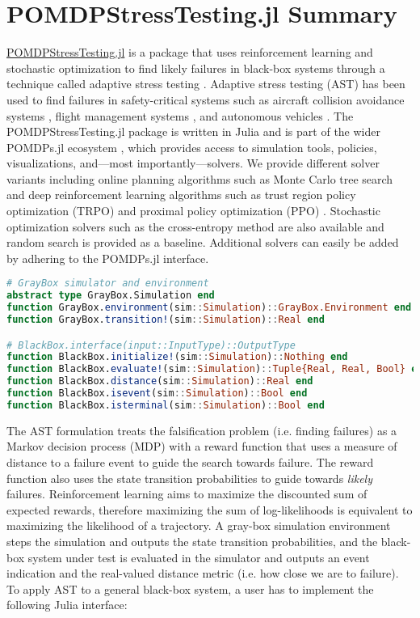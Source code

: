 \section{POMDPStressTesting.jl Summary}

\href{https://github.com/sisl/POMDPStressTesting.jl}{POMDPStressTesting.jl} is a package that uses reinforcement learning and stochastic optimization to find likely failures in black-box systems through a technique called adaptive stress testing \cite{ast}.
Adaptive stress testing (AST) has been used to find failures in safety-critical systems such as aircraft collision avoidance systems \cite{ast_acasx}, flight management systems \cite{ast_fms}, and autonomous vehicles \cite{ast_av}.
The POMDPStressTesting.jl package is written in Julia \cite{bezanson2017julia} and is part of the wider POMDPs.jl ecosystem \cite{pomdps_jl}, which provides access to simulation tools, policies, visualizations, and---most importantly---solvers.
We provide different solver variants including online planning algorithms such as Monte Carlo tree search \cite{mcts} and deep reinforcement learning algorithms such as trust region policy optimization (TRPO) \cite{trpo} and proximal policy optimization (PPO) \cite{ppo}.
Stochastic optimization solvers such as the cross-entropy method \cite{cem} are also available and random search is provided as a baseline.
Additional solvers can easily be added by adhering to the POMDPs.jl interface.

\begin{lstlisting}[language=Julia]
# GrayBox simulator and environment
abstract type GrayBox.Simulation end
function GrayBox.environment(sim::Simulation)::GrayBox.Environment end
function GrayBox.transition!(sim::Simulation)::Real end

# BlackBox.interface(input::InputType)::OutputType
function BlackBox.initialize!(sim::Simulation)::Nothing end
function BlackBox.evaluate!(sim::Simulation)::Tuple{Real, Real, Bool} end
function BlackBox.distance(sim::Simulation)::Real end
function BlackBox.isevent(sim::Simulation)::Bool end
function BlackBox.isterminal(sim::Simulation)::Bool end
\end{lstlisting}

The AST formulation treats the falsification problem (i.e. finding failures) as a Markov decision process (MDP) with a reward function that uses a measure of distance to a failure event to guide the search towards failure.
The reward function also uses the state transition probabilities to guide towards \textit{likely} failures.
Reinforcement learning aims to maximize the discounted sum of expected rewards, therefore maximizing the sum of log-likelihoods is equivalent to maximizing the likelihood of a trajectory.
A gray-box simulation environment steps the simulation and outputs the state transition probabilities, and the black-box system under test is evaluated in the simulator and outputs an event indication and the real-valued distance metric (i.e. how close we are to failure).
To apply AST to a general black-box system, a user has to implement the following Julia interface:


